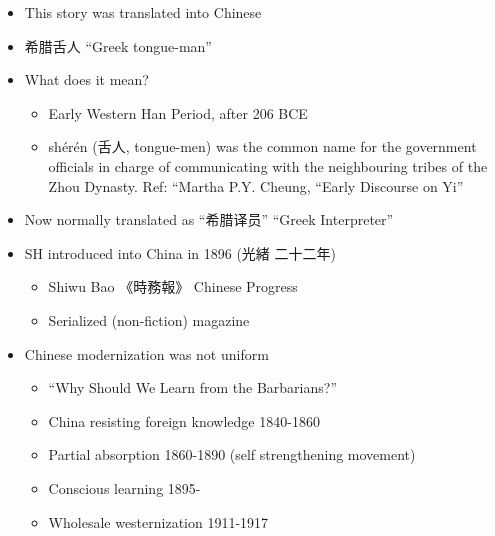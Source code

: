 \documentclass[a4paper,landscape,headrule,footrule,xetex]{foils}
\begin{document}
\begin{itemize}
\item This story was translated into Chinese
\item  希腊舌人  “Greek tongue-man”
\item  What does it mean?
  \begin{itemize}
  \item Early Western Han Period, after 206 BCE
  \item shérén (舌人, tongue-men) was the common name for the
    government officials in charge of communicating with the
    neighbouring tribes of the Zhou Dynasty.  Ref: “Martha
    P.Y. Cheung, “Early Discourse on Yi”
  \end{itemize}
\item Now normally translated as ``希腊译员'' 
  ``Greek Interpreter''

\end{itemize}









\begin{itemize}
\item SH introduced into China in 1896 (光緒 二十二年)
  \begin{itemize}
  \item Shiwu Bao 《時務報》 Chinese Progress
  \item Serialized (non-fiction) magazine
  \end{itemize}
\item Chinese modernization was not uniform
  \begin{itemize}
  \item “Why Should We Learn from the Barbarians?”
  \item China resisting foreign knowledge 1840-1860
  \item  Partial absorption 1860-1890 (self strengthening movement)
  \item  Conscious learning 1895-
  \item  Wholesale westernization 1911-1917
  \end{itemize}
\end{itemize}
\end{document}
